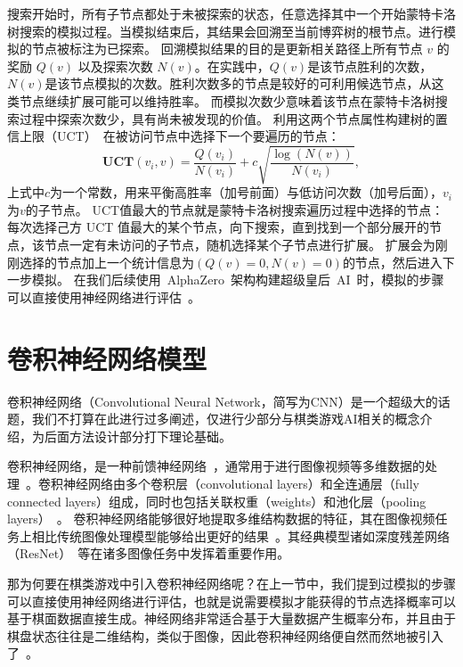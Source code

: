 搜索开始时，所有子节点都处于未被探索的状态，任意选择其中一个开始蒙特卡洛树搜索的模拟过程。当模拟结束后，其结果会回溯至当前博弈树的根节点。进行模拟的节点被标注为已探索。
回溯模拟结果的目的是更新相关路径上所有节点 $v$ 的奖励 $Q(v)$ 以及探索次数 $N(v)$。在实践中，$Q(v)$是该节点胜利的次数，$N(v)$是该节点模拟的次数。胜利次数多的节点是较好的可利用候选节点，从这类节点继续扩展可能可以维持胜率。
而模拟次数少意味着该节点在蒙特卡洛树搜索过程中探索次数少，具有尚未被发现的价值。
利用这两个节点属性构建树的置信上限（UCT）~\cite{10.1007/11871842_29}在被访问节点中选择下一个要遍历的节点：
\begin{equation*}
    \textbf{UCT}(v_{i},v) = \frac{Q(v_{i})}{N(v_{i})} + c\sqrt{\frac{\log(N(v))}{N(v_{i})}},
\end{equation*}
上式中$c$为一个常数，用来平衡高胜率（加号前面）与低访问次数（加号后面），$v_{i}$为$v$的子节点。
UCT值最大的节点就是蒙特卡洛树搜索遍历过程中选择的节点：每次选择己方 UCT 值最大的某个节点，向下搜索，直到找到一个部分展开的节点，该节点一定有未访问的子节点，随机选择某个子节点进行扩展。
扩展会为刚刚选择的节点加上一个统计信息为$(Q(v)=0,N(v)=0)$的节点，然后进入下一步模拟。
在我们后续使用~AlphaZero~架构构建超级皇后~AI~时，模拟的步骤可以直接使用神经网络进行评估~\cite{Silver1140,Silver2017,Silver2016}。

\section{卷积神经网络模型}
卷积神经网络（Convolutional Neural Network，简写为CNN）是一个超级大的话题，我们不打算在此进行过多阐述，仅进行少部分与棋类游戏AI相关的概念介绍，为后面方法设计部分打下理论基础。

卷积神经网络，是一种前馈神经网络~\cite{SCHMIDHUBER201585}，通常用于进行图像视频等多维数据的处理~\cite{NIPS2012_4824}。卷积神经网络由多个卷积层（convolutional layers）和全连通层（fully connected layers）组成，同时也包括关联权重（weights）和池化层（pooling layers）~\cite{venkatesan2017convolutional}。
卷积神经网络能够很好地提取多维结构数据的特征，其在图像视频任务上相比传统图像处理模型能够给出更好的结果~\cite{VALUEVA2020232}。其经典模型诸如深度残差网络（ResNet）~\cite{resnet}等在诸多图像任务中发挥着重要作用。

那为何要在棋类游戏中引入卷积神经网络呢？在上一节中，我们提到过模拟的步骤可以直接使用神经网络进行评估，也就是说需要模拟才能获得的节点选择概率可以基于棋面数据直接生成。神经网络非常适合基于大量数据产生概率分布，并且由于棋盘状态往往是二维结构，类似于图像，因此卷积神经网络便自然而然地被引入了~\cite{Silver1140,Silver2017,Silver2016}。

